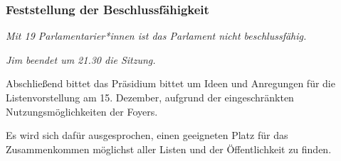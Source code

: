 \documentclass[ngerman,headheight=70pt]{scrartcl}
\begin{document}
    \subsubsection{Feststellung der Beschlussfähigkeit}

    \textit{Mit 19 Parlamentarier*innen ist das Parlament nicht beschlussfähig.}

    \textit{Jim beendet um 21.30 die Sitzung.}

    Abschließend bittet das Präsidium bittet um Ideen und Anregungen für die
    Listenvorstellung am 15. Dezember, aufgrund der eingeschränkten
    Nutzungsmöglichkeiten der Foyers.

    Es wird sich dafür ausgesprochen, einen geeigneten Platz für das
    Zusammenkommen möglichst aller Listen und der Öffentlichkeit zu finden.
\end{document}
